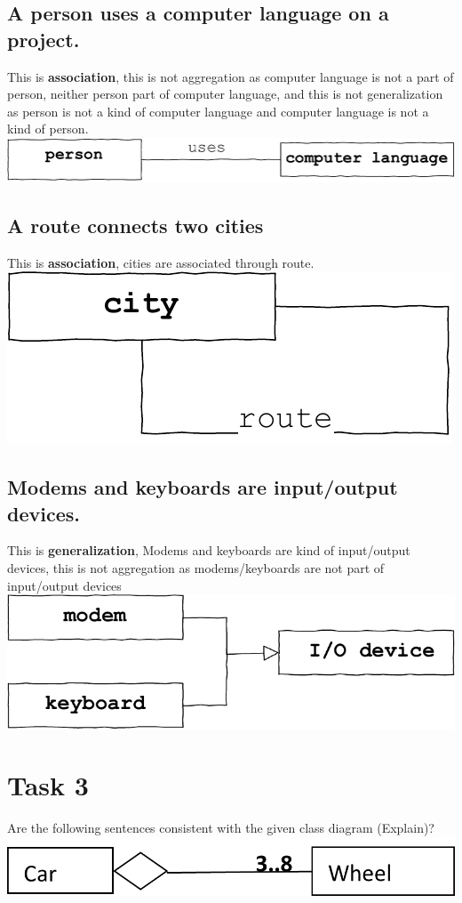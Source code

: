 \documentclass[12pt]{article}
\begin{document}
\subsection{A person uses a computer language on a project. }
This is \textbf{association}, this is not aggregation as computer language is not a part of person, neither person part of computer language, and this is not generalization as person is not a kind of computer language and computer language is not a kind of person.
\\ \includegraphics[width=\textwidth]{35.pdf}
\subsection{A route connects two cities }
This is \textbf{association}, cities are associated through route.
\\ \includegraphics[width=\textwidth]{36.pdf}

\newpage
\subsection{Modems and keyboards are input/output devices. }
This is \textbf{generalization}, Modems and keyboards are kind of input/output devices, this is not aggregation as modems/keyboards are not part of input/output devices
\\ \includegraphics[width=\textwidth]{37.pdf}
\section{Task 3}
Are the following sentences consistent with the given class diagram (Explain)?
\\
\includegraphics[width=\textwidth]{Class1_103.png}
\end{document}
